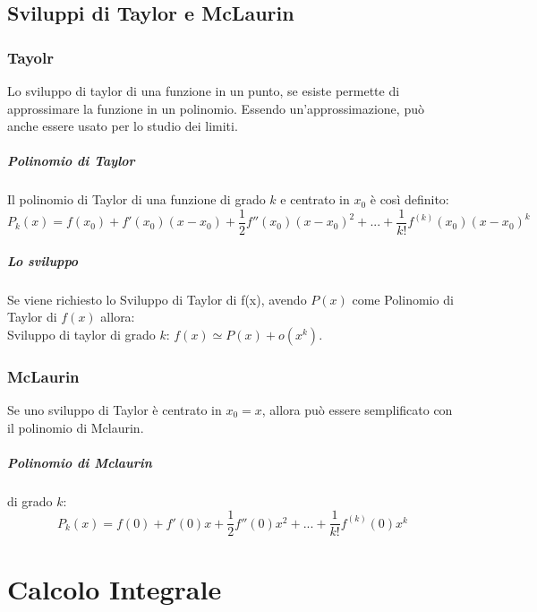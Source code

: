 \documentclass[12pt, a4paper, openany]{book}
\begin{document}
\section{Sviluppi di Taylor e McLaurin}

\subsection{Tayolr}
Lo sviluppo di taylor di una funzione in un punto, se esiste permette di approssimare la funzione in un polinomio.
Essendo un'approssimazione, può anche essere usato per lo studio dei limiti.


\paragraph{Polinomio di Taylor} Il polinomio di Taylor di una funzione di grado $k$ e centrato in $x_0$ è così definito:
$$P_k(x)=f(x_0)+f'(x_0)(x-x_0) + \frac{1}{2}f''(x_0)(x-x_0)^2 +... + \frac{1}{k!}f^{(k)}(x_0)(x-x_0)^k$$

\paragraph*{Lo sviluppo} Se viene richiesto lo Sviluppo di Taylor di f(x), avendo $P(x)$ come Polinomio di Taylor di $f(x)$ allora:
\\Sviluppo di taylor di grado $k$: $f(x) \simeq P(x) + o(x^k)$.

\subsection{McLaurin}
Se uno sviluppo di Taylor è centrato in $x_0=x$, allora può essere semplificato con il polinomio di Mclaurin.
\paragraph*{Polinomio di Mclaurin} di grado $k$:
$$P_k(x)=f(0)+f'(0)x+\frac{1}{2}f''(0)x^2+...+\frac{1}{k!}f^{(k)}(0)x^k$$




\chapter{Calcolo Integrale}
\end{document}
